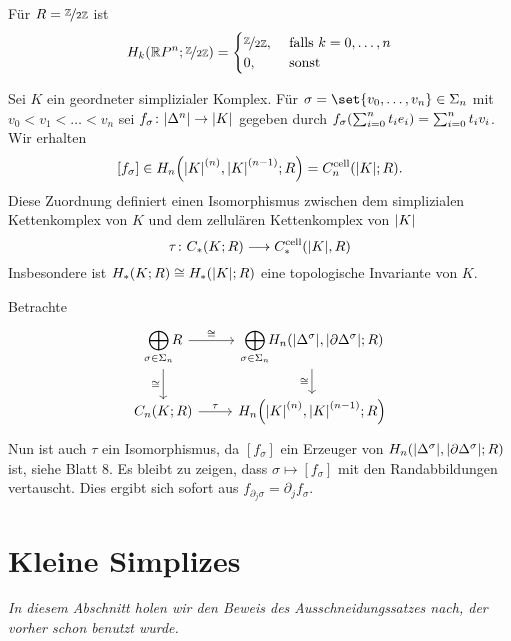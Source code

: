 Für $R=\nicefrac{\mathbb{Z}}{2 \mathbb{Z}}$ ist
\[
	H_k \enbrace*{\mathbb{R}P^n; \nicefrac{\mathbb{Z}}{2 \mathbb{Z}}} = \begin{cases}
		\nicefrac{\mathbb{Z}}{2 \mathbb{Z}}, &\text{ falls }k=0,\ldots ,n\\
		0 ,&\text{ sonst}
	\end{cases}
\]

\begin{satz}[{name=[{Isomorphie zwischen $C_*(K;R)$ und $C^{\cell}_n \enbrace*{\abs*{K};R}$}]}]
	Sei $K$ ein geordneter simplizialer Komplex. 
	Für $\sigma = \set{v_0, \ldots ,v_n} \in \Sigma_n$ mit $v_0 < v_1 < \ldots  < v_n$ sei $f_\sigma \colon \abs*{\Delta^n} \to \abs*{K}$ gegeben durch $f_\sigma \enbrace*{\sum_{i=0}^{n} t_i e_i} = \sum_{i=0}^{n} t_i v_i$. 
	Wir erhalten 
	\[
		[f_\sigma] \in H_n \enbrace*{\abs*{K}^{(n)}, \abs*{K}^{(n-1)};R} = C^{\cell}_n \enbrace*{\abs*{K};R}. 
	\]
	Diese Zuordnung definiert einen Isomorphismus zwischen dem simplizialen Kettenkomplex von $K$ und dem zellulären Kettenkomplex von $\abs*{K}$
	\[
		\tau \colon C_*(K;R) \longrightarrow C_*^{\cell}\enbrace*{\abs*{K},R } 
	\]
	Insbesondere ist $H_*(K;R) \cong H_*(\abs*{K};R)$ eine topologische Invariante von $K$.
\end{satz}
\begin{beweis}
	Betrachte 
	\[
		\begin{tikzcd}
			\smashoperator[r]{\bigoplus\limits_{\sigma \in \Sigma_n}} R \dar["\cong"'] \rar["\cong"]
			& \smashoperator[r]{\bigoplus\limits_{\sigma \in \Sigma_n}} H_n \enbrace*{\abs*{\Delta^\sigma}, \abs*{\partial \Delta^\sigma};R} \dar["\cong"'] \\
			C_n(K;R) \rar["\tau"] & H_n \enbrace*{\abs*{K}^{(n)}, \abs*{K}^{(n-1)};R} 
		\end{tikzcd}
	\]
	Nun ist auch $\tau$ ein Isomorphismus, da $[f_\sigma]$ ein Erzeuger von $H_n \enbrace*{\abs*{\Delta^\sigma}, \abs*{\partial \Delta^\sigma};R}$ ist, siehe Blatt 8. 
	Es bleibt zu zeigen, dass $\sigma \mapsto  [f_\sigma]$ mit den Randabbildungen vertauscht. 
	Dies ergibt sich sofort aus $f_{\partial_j \sigma} = \partial_j f_\sigma$.
\end{beweis}

\newpage

\section{Kleine Simplizes} %
\label{sec:13}

\emph{In diesem Abschnitt holen wir den Beweis des Ausschneidungssatzes nach, der vorher schon benutzt wurde.}

